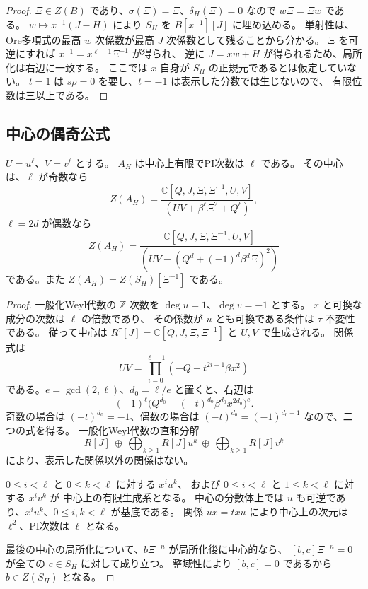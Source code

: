 \begin{proof}
$\Xi\in Z(B)$ であり、$\sigma(\Xi)=\Xi$、$\delta_H(\Xi)=0$ なので
$w\Xi=\Xi w$ である。
$w\mapsto x^{-1}(J-H)$ により $S_H$ を $B[x^{-1}][J]$ に埋め込める。
単射性は、Ore多項式の最高 $w$ 次係数が最高 $J$ 次係数として残ることから分かる。
$\Xi$ を可逆にすれば $x^{-1}=x^{\ell-1}\Xi^{-1}$ が得られ、
逆に $J=xw+H$ が得られるため、局所化は右辺に一致する。
ここでは $x$ 自身が $S_H$ の正規元であるとは仮定していない。
$t=1$ は $s\rho=0$ を要し、$t=-1$ は表示した分数では生じないので、
有限位数は三以上である。
\end{proof}

\subsection{中心の偶奇公式}

\begin{theorem}[一の冪根chartの中心]
\label{thm:root-center-v38}
$U=u^\ell$、$V=v^\ell$ とする。
$A_H$ は中心上有限でPI次数は $\ell$ である。
その中心は、$\ell$ が奇数なら
\begin{equation}
\label{eq:root-center-odd-v38}
 Z(A_H)=
 \frac{\mathbb C[Q,J,\Xi,\Xi^{-1},U,V]}
 {(UV+\beta^\ell\Xi^2+Q^\ell)},
\end{equation}
$\ell=2d$ が偶数なら
\begin{equation}
\label{eq:root-center-even-v38}
 Z(A_H)=
 \frac{\mathbb C[Q,J,\Xi,\Xi^{-1},U,V]}
 {(UV-(Q^d+(-1)^d\beta^d\Xi)^2)}
\end{equation}
である。また $Z(A_H)=Z(S_H)[\Xi^{-1}]$ である。
\end{theorem}

\begin{proof}
一般化Weyl代数の $\mathbb Z$ 次数を $\deg u=1$、$\deg v=-1$ とする。
$x$ と可換な成分の次数は $\ell$ の倍数であり、
その係数が $u$ とも可換である条件は $\tau$ 不変性である。
従って中心は $R^\tau[J]=\mathbb C[Q,J,\Xi,\Xi^{-1}]$ と $U,V$ で生成される。
関係式は
\begin{equation}
\label{eq:root-norm-v38}
 UV=\prod_{i=0}^{\ell-1}(-Q-t^{2i+1}\beta x^2)
\end{equation}
である。$e=\gcd(2,\ell)$、$d_0=\ell/e$ と置くと、右辺は
\[
 (-1)^\ell\bigl(Q^{d_0}-(-t)^{d_0}\beta^{d_0}x^{2d_0}\bigr)^e.
\]
奇数の場合は $(-t)^{d_0}=-1$、偶数の場合は $(-t)^{d_0}=(-1)^{d_0+1}$ なので、二つの式を得る。
一般化Weyl代数の直和分解
\[
 R[J]\ \oplus\,\bigoplus_{k\ge1}R[J]u^k
 \ \oplus\,\bigoplus_{k\ge1}R[J]v^k
\]
により、表示した関係以外の関係はない。

$0\le i<\ell$ と $0\le k<\ell$ に対する $x^iu^k$、
および $0\le i<\ell$ と $1\le k<\ell$ に対する $x^iv^k$ が
中心上の有限生成系となる。
中心の分数体上では $u$ も可逆であり、$x^i u^k$、$0\le i,k<\ell$ が基底である。
関係 $ux=txu$ により中心上の次元は $\ell^2$、PI次数は $\ell$ となる。

最後の中心の局所化について、$b\Xi^{-n}$ が局所化後に中心的なら、
$[b,c]\Xi^{-n}=0$ が全ての $c\in S_H$ に対して成り立つ。
整域性により $[b,c]=0$ であるから $b\in Z(S_H)$ となる。
\end{proof}

